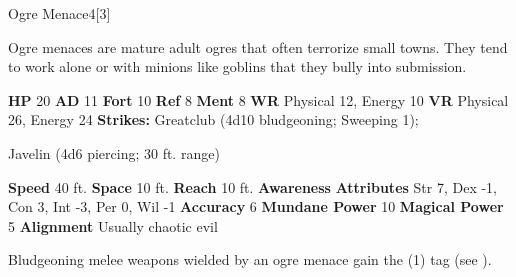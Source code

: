   

  \begin{monsubsection}{Ogre Menace}{4}[3]
    \vspace{-1em}\vspace{-1em}
    \vspace{0em}

    
          Ogre menaces are mature adult ogres that often terrorize small towns.
          They tend to work alone or with minions like goblins that they bully into submission.
        

    \begin{spellcontent}
      \begin{spelltargetinginfo}
        \pari \textbf{HP} 20 \monsep
          \textbf{AD} 11 \monsep
          \textbf{Fort} 10 \monsep
          \textbf{Ref} 8 \monsep
          \textbf{Ment} 8
        \pari \textbf{WR} Physical 12, Energy 10 \monsep
        \textbf{VR} Physical 26, Energy 24
        \pari \textbf{Strikes:}
            Greatclub  (4d10 bludgeoning; Sweeping 1);
\par Javelin  (4d6 piercing; 30 ft. range)
      \end{spelltargetinginfo}
    \end{spellcontent}
    \begin{monsterfooter}
      \pari \textbf{Speed} 40 ft. \monsep
        \textbf{Space} 10 ft. \monsep
        \textbf{Reach} 10 ft.
      \pari \textbf{Awareness} 
      \pari \textbf{Attributes}
        Str 7, Dex -1,
        Con 3, Int -3,
        Per 0, Wil -1
      \pari \textbf{Accuracy} 6 \monsep
        \textbf{Mundane Power} 10 \monsep
      \textbf{Magical Power} 5
      \pari \textbf{Alignment} Usually chaotic evil
    \end{monsterfooter}
  \end{monsubsection}
            Bludgeoning melee weapons wielded by an ogre menace gain the  (1) tag (see ).
  

